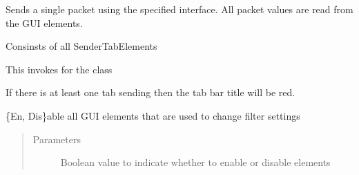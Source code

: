 \documentclass[letterpaper,10pt,english]{sphinxmanual}
\begin{document}
\begin{fulllineitems}
\begin{fulllineitems}
\begin{quote}
\begin{description}
\end{description}\end{quote}

\end{fulllineitems}


\begin{fulllineitems}
\label{\detokenize{src:src.SenderTab.SenderTab.sendSinglePacket}}
Sends a single packet using the specified interface.
All packet values are read from the GUI elements.

\end{fulllineitems}


\begin{fulllineitems}
\label{\detokenize{src:src.SenderTab.SenderTab.senderTabs}}
Consinsts of all SenderTabElements

\end{fulllineitems}


\begin{fulllineitems}
\label{\detokenize{src:src.SenderTab.SenderTab.setInitialCANData}}
This invokes  for the class

\end{fulllineitems}


\begin{fulllineitems}
\label{\detokenize{src:src.SenderTab.SenderTab.toggleActive}}
If there is at least one tab sending then the tab bar title will be red.

\end{fulllineitems}


\begin{fulllineitems}
\label{\detokenize{src:src.SenderTab.SenderTab.toggleGUIElements}}
\{En, Dis\}able all GUI elements that are used to change filter settings
\begin{quote}\begin{description}
\item[{Parameters}] \leavevmode
{} \textendash{} Boolean value to indicate whether to enable or disable elements


\end{description}
\end{quote}
\end{fulllineitems}
\end{fulllineitems}
\end{document}
